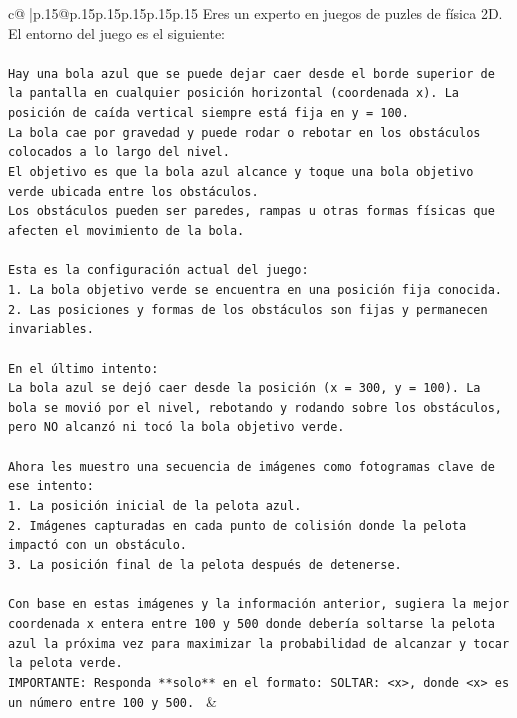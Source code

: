\documentclass{article}
\begin{document}
{\begin{supertabular}{c@{$\;$}|p{.15\linewidth}@{}p{.15\linewidth}p{.15\linewidth}p{.15\linewidth}p{.15\linewidth}p{.15\linewidth}}
{{{	 Eres un experto en juegos de puzles de física 2D. El entorno del juego es el siguiente:\\ \tt \\ \tt Hay una bola azul que se puede dejar caer desde el borde superior de la pantalla en cualquier posición horizontal (coordenada x). La posición de caída vertical siempre está fija en y = 100.\\ \tt La bola cae por gravedad y puede rodar o rebotar en los obstáculos colocados a lo largo del nivel.\\ \tt El objetivo es que la bola azul alcance y toque una bola objetivo verde ubicada entre los obstáculos.\\ \tt Los obstáculos pueden ser paredes, rampas u otras formas físicas que afecten el movimiento de la bola.\\ \tt \\ \tt Esta es la configuración actual del juego:\\ \tt 1. La bola objetivo verde se encuentra en una posición fija conocida.\\ \tt 2. Las posiciones y formas de los obstáculos son fijas y permanecen invariables.\\ \tt \\ \tt En el último intento:\\ \tt La bola azul se dejó caer desde la posición (x = 300, y = 100). La bola se movió por el nivel, rebotando y rodando sobre los obstáculos, pero NO alcanzó ni tocó la bola objetivo verde.\\ \tt \\ \tt Ahora les muestro una secuencia de imágenes como fotogramas clave de ese intento:\\ \tt 1. La posición inicial de la pelota azul.\\ \tt 2. Imágenes capturadas en cada punto de colisión donde la pelota impactó con un obstáculo.\\ \tt 3. La posición final de la pelota después de detenerse.\\ \tt \\ \tt Con base en estas imágenes y la información anterior, sugiera la mejor coordenada x entera entre 100 y 500 donde debería soltarse la pelota azul la próxima vez para maximizar la probabilidad de alcanzar y tocar la pelota verde.\\ \tt IMPORTANTE: Responda **solo** en el formato: SOLTAR: <x>, donde <x> es un número entre 100 y 500. 
	  } 
	   } 
	   } 
	 & \\ 
 


\end{supertabular}}
\end{document}
